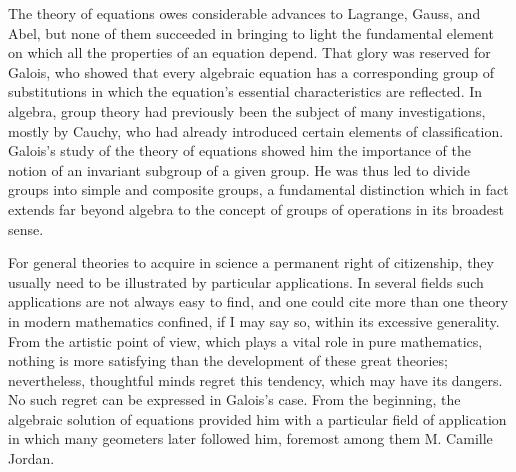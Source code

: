 The theory of equations owes considerable advances to Lagrange, Gauss, and
Abel, but none of them succeeded in bringing to light the fundamental element
on which all the properties of an equation depend. That glory was reserved for
Galois, who showed that every algebraic equation has a corresponding group of
substitutions in which the equation's essential characteristics are reflected.
In algebra, group theory had previously been the subject of many investigations,
mostly by Cauchy, who had already introduced certain elements of classification.
Galois's study of the theory of equations showed him the importance of the
notion of an invariant subgroup of a given group. He was thus led to divide
groups into simple and composite groups, a fundamental distinction which in
fact extends far beyond algebra to the concept of groups of operations in its
broadest sense.

For general theories to acquire in science a%
%
permanent right of citizenship, they usually need to be illustrated by
particular applications. In several fields such applications are not always
easy to find, and one could cite more than one theory in modern mathematics
confined, if I may say so, within its excessive generality. From the artistic
point of view, which plays a vital role in pure mathematics, nothing is more
satisfying than the development of these great theories; nevertheless,
thoughtful minds regret this tendency, which may have its dangers. No such
regret can be expressed in Galois's case. From the beginning, the algebraic
solution of equations provided him with a particular field of application in
which many geometers later followed him, foremost among them M. Camille Jordan.

